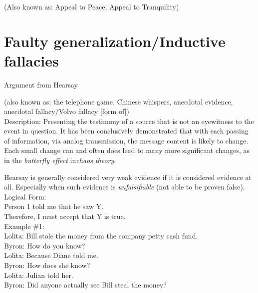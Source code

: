 \documentclass[a4paper,12pt,single,pdftex]{scrbook}
\begin{document}
  
    
      (Also known as: Appeal to Peace, Appeal to Tranquility)
    \\

  \chapter{Faulty generalization/Inductive fallacies}


Argument from Hearsay
    
      (also known as: the telephone game, Chinese whispers, anecdotal evidence, anecdotal fallacy/Volvo fallacy [form of])
    \\

  
    Description: Presenting the testimony of a source that is not an eyewitness to the event in question.  It has been conclusively demonstrated that with each passing of information, via analog transmission, the message content is likely to change.  Each small change can and often does lead to many more significant changes, as in the {\it butterfly effect} in{\it  chaos theory}.

    
      Hearsay is generally considered very weak evidence if it is considered evidence at all.  Especially when such evidence is {\it unfalsifiable}  (not able to be proven false).
    \\

    
      Logical Form:
    \\

    
      Person 1 told me that he saw Y.
    \\

    
      Therefore, I must accept that Y is true.
    \\

    
      Example \#1:
    \\

    
      Lolita: Bill stole the money from the company petty cash fund.
    \\

    
      Byron: How do you know?
    \\

    
      Lolita: Because Diane told me.
    \\

    
      Byron: How does she know?
    \\

    
      Lolita: Julian told her.
    \\

    
      Byron: Did anyone actually see Bill steal the money?
    \\
\end{document}

